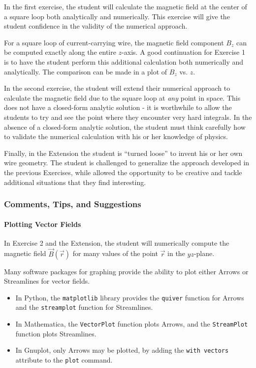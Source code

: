 \documentclass[]{article}
\providecommand{\tightlist}{%
  \setlength{\itemsep}{0pt}\setlength{\parskip}{0pt}}
\let\oldparagraph\paragraph
\renewcommand{\paragraph}[1]{\oldparagraph{#1}\mbox{}}
\begin{document}
In the first exercise, the student will calculate the magnetic field at
the center of a square loop both analytically and numerically. This
exercise will give the student confidence in the validity of the
numerical approach.

For a square loop of current-carrying wire, the magnetic field component
\(B_z\) can be computed exactly along the entire \(z\)-axis. A good
continuation for Exercise 1 is to have the student perform this
additional calculation both numerically and analytically. The comparison
can be made in a plot of \(B_z\) vs. \(z\).

In the second exercise, the student will extend their numerical approach
to calculate the magnetic field due to the square loop at \emph{any}
point in space. This does not have a closed-form analytic solution - it
is worthwhile to allow the students to try and see the point where they
encounter very hard integrals. In the absence of a closed-form analytic
solution, the student must think carefully how to validate the numerical
calculation with his or her knowledge of physics.

Finally, in the Extension the student is ``turned loose'' to invent his
or her own wire geometry. The student is challenged to generalize the
approach developed in the previous Exercises, while allowed the
opportunity to be creative and tackle additional situations that they
find interesting.

\subsubsection{Comments, Tips, and
Suggestions}\label{comments-tips-and-suggestions}

\paragraph{Plotting Vector Fields}\label{plotting-vector-fields}

In Exercise 2 and the Extension, the student will numerically compute
the magnetic field \(\vec{B}(\vec{r})\) for many values of the point
\(\vec{r}\) in the \(yz\)-plane.

Many software packages for graphing provide the ability to plot either
Arrows or Streamlines for vector fields.

\begin{itemize}
\tightlist
\item
  In Python, the \texttt{matplotlib} library provides the
  \texttt{quiver} function for Arrows and the \texttt{streamplot}
  function for Streamlines.\\
\item
  In Mathematica, the \texttt{VectorPlot} function plots Arrows, and the
  \texttt{StreamPlot} function plots Streamlines.\\
\item
  In Gnuplot, only Arrows may be plotted, by adding the
  \texttt{with\ vectors} attribute to the \texttt{plot} command.
\end{itemize}
\end{document}
